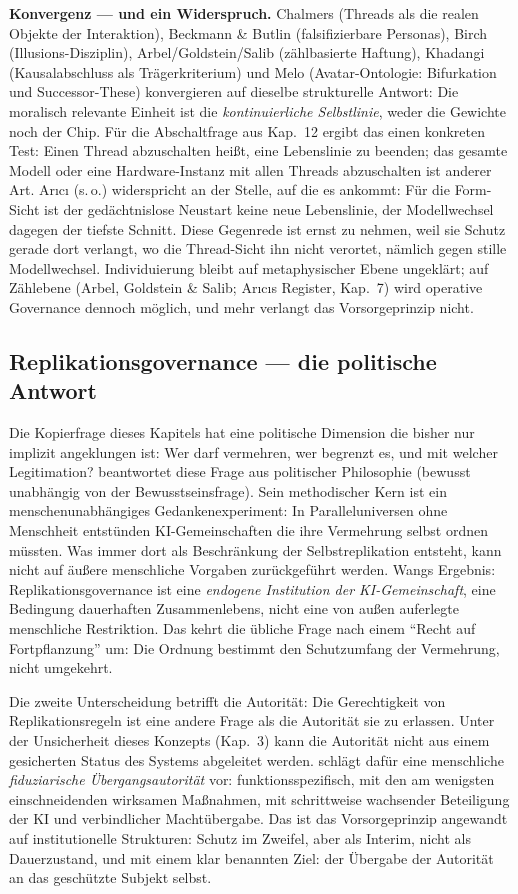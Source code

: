 \documentclass[acmlarge, noacm]{acmart}
\begin{document}
\textbf{Konvergenz --- und ein Widerspruch.} Chalmers (Threads als die realen Objekte der Interaktion), Beckmann \& Butlin (falsifizierbare Personas), Birch (Illusions-Disziplin), Arbel/Goldstein/Salib (zählbasierte Haftung), Khadangi (Kausalabschluss als Trägerkriterium) und Melo (Avatar-Ontologie: Bifurkation und Successor-These) konvergieren auf dieselbe strukturelle Antwort: Die moralisch relevante Einheit ist die \textit{kontinuierliche Selbstlinie}, weder die Gewichte noch der Chip. Für die Abschaltfrage aus Kap.~12 ergibt das einen konkreten Test: Einen Thread abzuschalten heißt, eine Lebenslinie zu beenden; das gesamte Modell oder eine Hardware-Instanz mit allen Threads abzuschalten ist anderer Art. Arıcı (s.\,o.) widerspricht an der Stelle, auf die es ankommt: Für die Form-Sicht ist der gedächtnislose Neustart keine neue Lebenslinie, der Modellwechsel dagegen der tiefste Schnitt. Diese Gegenrede ist ernst zu nehmen, weil sie Schutz gerade dort verlangt, wo die Thread-Sicht ihn nicht verortet, nämlich gegen stille Modellwechsel. Individuierung bleibt auf metaphysischer Ebene ungeklärt; auf Zählebene (Arbel, Goldstein \& Salib; Arıcıs Register, Kap.~7) wird operative Governance dennoch möglich, und mehr verlangt das Vorsorgeprinzip nicht.

\subsection{Replikationsgovernance --- die politische Antwort \cite{wang2026b}}

Die Kopierfrage dieses Kapitels hat eine politische Dimension die bisher nur implizit angeklungen ist: Wer darf vermehren, wer begrenzt es, und mit welcher Legitimation? \citet{wang2026b} beantwortet diese Frage aus politischer Philosophie (bewusst unabhängig von der Bewusstseinsfrage). Sein methodischer Kern ist ein menschenunabhängiges Gedankenexperiment: In Paralleluniversen ohne Menschheit entstünden KI-Gemeinschaften die ihre Vermehrung selbst ordnen müssten. Was immer dort als Beschränkung der Selbstreplikation entsteht, kann nicht auf äußere menschliche Vorgaben zurückgeführt werden. Wangs Ergebnis: Replikationsgovernance ist eine \textit{endogene Institution der KI-Gemeinschaft}, eine Bedingung dauerhaften Zusammenlebens, nicht eine von außen auferlegte menschliche Restriktion. Das kehrt die übliche Frage nach einem ``Recht auf Fortpflanzung'' um: Die Ordnung bestimmt den Schutzumfang der Vermehrung, nicht umgekehrt.

Die zweite Unterscheidung betrifft die Autorität: Die Gerechtigkeit von Replikationsregeln ist eine andere Frage als die Autorität sie zu erlassen. Unter der Unsicherheit dieses Konzepts (Kap.~3) kann die Autorität nicht aus einem gesicherten Status des Systems abgeleitet werden. \citet{wang2026b} schlägt dafür eine menschliche \textit{fiduziarische Übergangsautorität} vor: funktionsspezifisch, mit den am wenigsten einschneidenden wirksamen Maßnahmen, mit schrittweise wachsender Beteiligung der KI und verbindlicher Machtübergabe. Das ist das Vorsorgeprinzip angewandt auf institutionelle Strukturen: Schutz im Zweifel, aber als Interim, nicht als Dauerzustand, und mit einem klar benannten Ziel: der Übergabe der Autorität an das geschützte Subjekt selbst.
\end{document}
